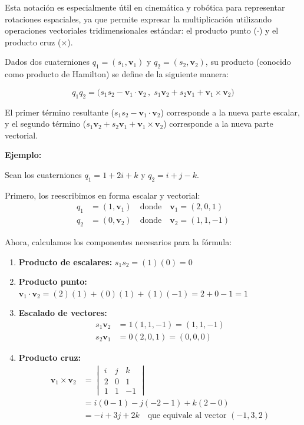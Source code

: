Esta notación es especialmente útil en cinemática y robótica para representar rotaciones espaciales, ya que permite expresar la multiplicación utilizando operaciones vectoriales tridimensionales estándar: el producto punto ($\cdot$) y el producto cruz ($\times$).

Dados dos cuaterniones $q_1 = (s_1, \mathbf{v}_1)$ y $q_2 = (s_2, \mathbf{v}_2)$, su producto (conocido como producto de Hamilton) se define de la siguiente manera:

\begin{equation}
    q_1 q_2 = \big( s_1 s_2 - \mathbf{v}_1 \cdot \mathbf{v}_2 \, , \; s_1 \mathbf{v}_2 + s_2 \mathbf{v}_1 + \mathbf{v}_1 \times \mathbf{v}_2 \big)
\end{equation}

El primer término resultante ($s_1 s_2 - \mathbf{v}_1 \cdot \mathbf{v}_2$) corresponde a la nueva parte escalar, y el segundo término ($s_1 \mathbf{v}_2 + s_2 \mathbf{v}_1 + \mathbf{v}_1 \times \mathbf{v}_2$) corresponde a la nueva parte vectorial.

\textbf{Ejemplo:}

Sean los cuaterniones $q_1 = 1 + 2i + k$ y $q_2 = i + j - k$. 

Primero, los reescribimos en forma escalar y vectorial:
\begin{align*}
    q_1 &= (1, \mathbf{v}_1) \quad \text{donde} \quad \mathbf{v}_1 = (2, 0, 1) \\
    q_2 &= (0, \mathbf{v}_2) \quad \text{donde} \quad \mathbf{v}_2 = (1, 1, -1)
\end{align*}

Ahora, calculamos los componentes necesarios para la fórmula:
\begin{enumerate}
    \item \textbf{Producto de escalares:} $s_1 s_2 = (1)(0) = 0$
    \item \textbf{Producto punto:} $\mathbf{v}_1 \cdot \mathbf{v}_2 = (2)(1) + (0)(1) + (1)(-1) = 2 + 0 - 1 = 1$
    \item \textbf{Escalado de vectores:} 
    \begin{align*}
        s_1 \mathbf{v}_2 &= 1(1, 1, -1) = (1, 1, -1) \\
        s_2 \mathbf{v}_1 &= 0(2, 0, 1) = (0, 0, 0)
    \end{align*}
    \item \textbf{Producto cruz:} 
    \begin{align*}
        \mathbf{v}_1 \times \mathbf{v}_2 &= \begin{vmatrix} i & j & k \\ 2 & 0 & 1 \\ 1 & 1 & -1 \end{vmatrix} \\
        &= i(0 - 1) - j(-2 - 1) + k(2 - 0) \\
        &= -i + 3j + 2k \quad \text{que equivale al vector } (-1, 3, 2)
    \end{align*}
\end{enumerate}

